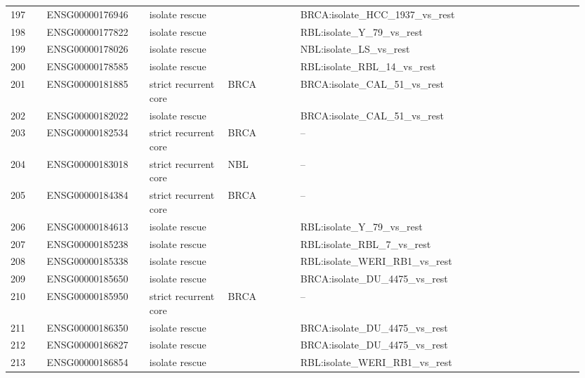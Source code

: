 \begin{landscape}
{\begin{longtable}{p{0.06\linewidth}p{0.17\linewidth}p{0.13\linewidth}p{0.12\linewidth}p{0.47\linewidth}}
197 & ENSG00000176946 & isolate rescue &  & BRCA:isolate\_\allowbreak{}HCC\_\allowbreak{}1937\_\allowbreak{}vs\_\allowbreak{}rest \\
198 & ENSG00000177822 & isolate rescue &  & RBL:isolate\_\allowbreak{}Y\_\allowbreak{}79\_\allowbreak{}vs\_\allowbreak{}rest \\
199 & ENSG00000178026 & isolate rescue &  & NBL:isolate\_\allowbreak{}LS\_\allowbreak{}vs\_\allowbreak{}rest \\
200 & ENSG00000178585 & isolate rescue &  & RBL:isolate\_\allowbreak{}RBL\_\allowbreak{}14\_\allowbreak{}vs\_\allowbreak{}rest \\
201 & ENSG00000181885 & strict recurrent core & BRCA & BRCA:isolate\_\allowbreak{}CAL\_\allowbreak{}51\_\allowbreak{}vs\_\allowbreak{}rest \\
202 & ENSG00000182022 & isolate rescue &  & BRCA:isolate\_\allowbreak{}CAL\_\allowbreak{}51\_\allowbreak{}vs\_\allowbreak{}rest \\
203 & ENSG00000182534 & strict recurrent core & BRCA & -- \\
204 & ENSG00000183018 & strict recurrent core & NBL & -- \\
205 & ENSG00000184384 & strict recurrent core & BRCA & -- \\
206 & ENSG00000184613 & isolate rescue &  & RBL:isolate\_\allowbreak{}Y\_\allowbreak{}79\_\allowbreak{}vs\_\allowbreak{}rest \\
207 & ENSG00000185238 & isolate rescue &  & RBL:isolate\_\allowbreak{}RBL\_\allowbreak{}7\_\allowbreak{}vs\_\allowbreak{}rest \\
208 & ENSG00000185338 & isolate rescue &  & RBL:isolate\_\allowbreak{}WERI\_\allowbreak{}RB1\_\allowbreak{}vs\_\allowbreak{}rest \\
209 & ENSG00000185650 & isolate rescue &  & BRCA:isolate\_\allowbreak{}DU\_\allowbreak{}4475\_\allowbreak{}vs\_\allowbreak{}rest \\
210 & ENSG00000185950 & strict recurrent core & BRCA & -- \\
211 & ENSG00000186350 & isolate rescue &  & BRCA:isolate\_\allowbreak{}DU\_\allowbreak{}4475\_\allowbreak{}vs\_\allowbreak{}rest \\
212 & ENSG00000186827 & isolate rescue &  & BRCA:isolate\_\allowbreak{}DU\_\allowbreak{}4475\_\allowbreak{}vs\_\allowbreak{}rest \\
213 & ENSG00000186854 & isolate rescue &  & RBL:isolate\_\allowbreak{}WERI\_\allowbreak{}RB1\_\allowbreak{}vs\_\allowbreak{}rest \\

\end{longtable}}
\end{landscape}
